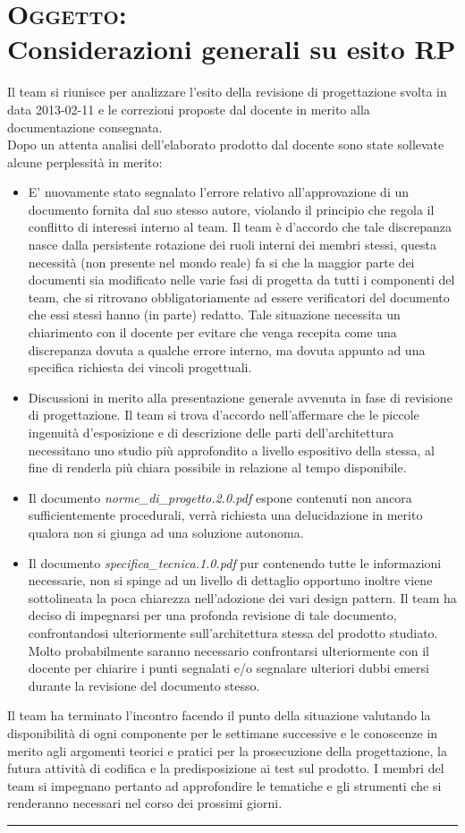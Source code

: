 \documentclass[a4paper,10pt,openright]{article}
\begin{document}
\section*{{\textsc{Oggetto:} \\Considerazioni generali su esito RP}}
Il team si riunisce per analizzare l'esito della revisione di progettazione svolta in data 2013-02-11 e le correzioni proposte dal docente in merito alla documentazione consegnata.\\
Dopo un attenta analisi dell'elaborato prodotto dal docente sono state sollevate alcune perplessità in merito:
\begin{itemize}
\item E' nuovamente stato segnalato l'errore relativo all'approvazione di un documento fornita dal suo stesso autore, violando il principio che regola il conflitto di interessi interno al team. Il team è d'accordo che tale discrepanza nasce dalla persistente rotazione dei ruoli interni dei membri stessi, questa necessità (non presente nel mondo reale) fa si che la maggior parte dei documenti sia modificato nelle varie fasi di progetta da tutti i componenti del team, che si ritrovano obbligatoriamente ad essere verificatori del documento che essi stessi hanno (in parte) redatto. Tale situazione necessita un chiarimento con il docente per evitare che venga recepita come una discrepanza dovuta a qualche errore interno, ma dovuta appunto ad una specifica richiesta dei vincoli progettuali.
\item Discussioni in merito alla presentazione generale avvenuta in fase di revisione di progettazione. Il team si trova d'accordo nell'affermare che le piccole ingenuità d'esposizione e di descrizione delle parti dell'architettura necessitano uno studio più approfondito a livello espositivo della stessa, al fine di renderla più chiara possibile in relazione al tempo disponibile.
\item Il documento \textit{norme\_di\_progetto.2.0.pdf} espone contenuti non ancora sufficientemente procedurali, verrà richiesta una delucidazione in merito qualora non si giunga ad una soluzione autonoma.
\item Il documento \textit{specifica\_tecnica.1.0.pdf} pur contenendo tutte le informazioni necessarie, non si spinge ad un livello di dettaglio opportuno inoltre viene sottolineata la poca chiarezza nell'adozione dei vari design pattern. Il team ha deciso di impegnarsi per una profonda revisione di tale documento, confrontandosi ulteriormente sull'architettura stessa del prodotto studiato. Molto probabilmente saranno necessario confrontarsi ulteriormente con il docente per chiarire i punti segnalati e/o segnalare ulteriori dubbi emersi durante la revisione del documento stesso.
\end{itemize}
Il team ha terminato l'incontro facendo il punto della situazione valutando la disponibilità di ogni componente per le settimane successive e le conoscenze in merito agli argomenti teorici e pratici per la prosecuzione della progettazione, la futura attività di codifica e la predisposizione ai test sul prodotto. I membri del team si impegnano pertanto ad approfondire le tematiche e gli strumenti che si renderanno necessari nel corso dei prossimi giorni.
\noindent\rule{\textwidth}{0.4pt}
\end{document}
